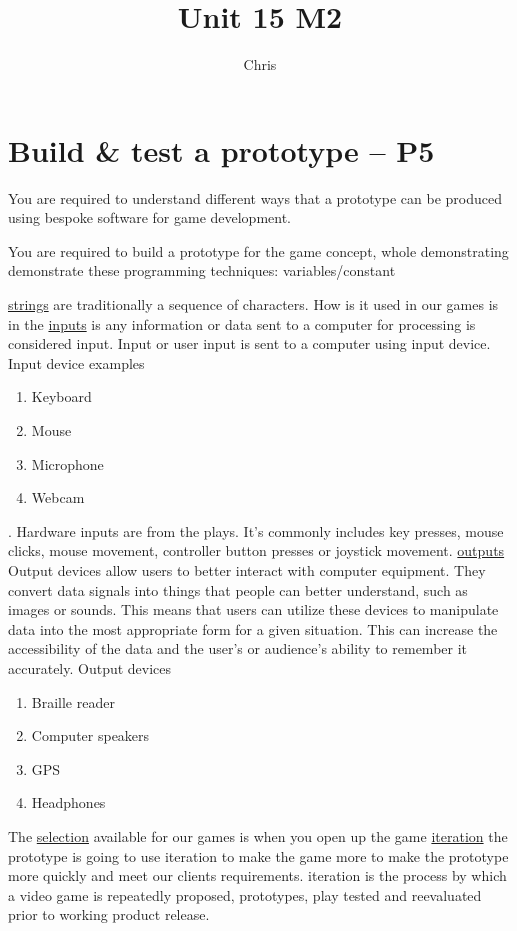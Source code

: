 \documentclass{article}
\begin{document}
\title{Unit 15 M2}
\author{Chris}
\date{}
\maketitle
 
\section{Build \& test a prototype – P5}
You are required to understand different ways that a prototype can be produced using bespoke
software for game development.

You are required to build a prototype for the game concept, whole demonstrating demonstrate
these programming techniques: variables/constant

\underline{strings} are traditionally a sequence of characters. How is it used in our games is in the 
\underline{inputs} is any information or data sent to a computer for processing is considered input. Input or user input is sent to a computer using input device. 
Input device examples
\begin{enumerate}
	\item Keyboard
	\item Mouse
	\item Microphone
	\item Webcam
\end{enumerate}
. Hardware inputs are from the plays. It's commonly includes key presses, mouse clicks, mouse movement, controller button presses or joystick movement.
\underline{outputs}
Output devices allow users to better interact with computer equipment. They convert data signals into things that people can better understand, such as images or sounds. This means that users can utilize these devices to manipulate data into the most appropriate form for a given situation. This can increase the accessibility of the data and the user's or audience's ability to remember it accurately.
Output devices
\begin{enumerate}
	\item Braille reader
	\item Computer speakers
	\item GPS
	\item Headphones
\end{enumerate}
The \underline{selection} available for our games is when you open up the game 
\underline{iteration} the prototype is going to use iteration to make the game more to make the prototype more quickly and meet our clients requirements. iteration is the process by which a video game is repeatedly proposed, prototypes, play tested and reevaluated prior to working product release.
\end{document}
